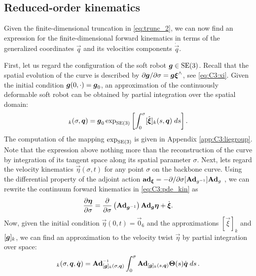 
\subsection{Reduced-order kinematics}
Given the finite-dimensional truncation in \eqref{eq:trunc_2}, we can now find an expression for the finite-dimensional forward kinematics in terms of the generalized coordinates $\vec{q}$ and its velocities components $\dot{\vec{q}}$.

First, let us regard the configuration of the soft robot $\boldsymbol{g} \in \textup{\textrm{SE}}(3)$. Recall that the spatial evolution of the curve is described by $\partial \boldsymbol{g}/\partial\sigma = \boldsymbol{g} \boldsymbol{\xi}^\wedge$, see \eqref{eq:C3:xi}. Given the initial condition $\boldsymbol{g}(0,\cdot) = \boldsymbol{g}_0$, an approximation of the continuously deformable soft robot can be obtained by partial integration over the spatial domain:
%
\vspace{-2mm}
\begin{equation}
[\mat{g}]_k(\sigma,\vec{q}) = \mat{g}_0 \exp_{\SE{3}}\left[\int_0^\sigma [\hat{\vec{\xi}}]_k(s,\vec{q}) \; ds \right].
\end{equation}
%
The computation of the mapping $\exp_{\textup{\textrm{SE}}(3)}$ is given in Appendix \ref{app:C3:liegroup}. Note that the expression above nothing more than the reconstruction of the curve by integration of its tangent space along its spatial parameter $\sigma$. Next, lets regard the velocity kinematics $\vec{\eta}(\sigma,t)$ for any point $\sigma$ on the backbone curve. Using the differential property of the adjoint action $\boldsymbol{\textbf{ad}}_{\boldsymbol{\xi}} = -\partial /\partial \sigma [\textbf{Ad}_{g^{-1}}] \textbf{Ad}_{g}$ \cite{Murray1994}, we can rewrite the
continuum forward kinematics in \eqref{eq:C3:pde_kin} as
%
\begin{equation}
\frac{\partial \boldsymbol{\eta}}{\partial \sigma } = \frac{\partial }{\partial \sigma }\left(\boldsymbol{\textbf{Ad}}_{\boldsymbol{g}^{-1}}\right) \boldsymbol{\textbf{Ad}}_{\boldsymbol{g}} \boldsymbol{\eta} + \dot{\boldsymbol{\xi}}. \label{eq:eta_adg}
\end{equation}
%
Now, given the initial condition $\vec{\eta}(0,t) = \vec{0}_6$ and the approximations $[\vec{\xi}]_k$ and $[\boldsymbol{g}]_k$, we can find an approximation to the velocity twist $\vec{\eta}$ by partial integration over space:
%
\begin{equation}
[\vec{\eta}]_k(\sigma,\vec{q},\dot{\vec{q}}) = \Ad_{[\mat{g}]_k(\sigma,\q)}\inv \int_0^\sigma \Ad_{[\mat{g}]_k(s,\q)} \mat{\Theta}(s) \dot{\vec{q}} \; ds \,. \label{eq:C3:eta_analytic}
\end{equation}
